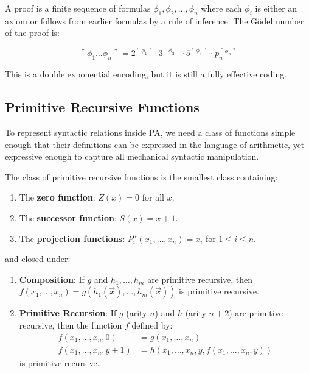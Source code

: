 A proof is a finite sequence of formulas $\phi_1, \phi_2, \dots, \phi_n$ where each $\phi_i$ is either an axiom or follows from earlier formulas by a rule of inference. The Gödel number of the proof is:

\[
\ulcorner \phi_1 \dots \phi_n \urcorner = 2^{\ulcorner \phi_1 \urcorner} \cdot 3^{\ulcorner \phi_2 \urcorner} \cdot 5^{\ulcorner \phi_3 \urcorner} \cdots p_n^{\ulcorner \phi_n \urcorner}
\]

This is a double exponential encoding, but it is still a fully effective coding.

\subsection{Primitive Recursive Functions}
\label{sec:godel:primrec}

To represent syntactic relations inside PA, we need a class of functions simple enough that their definitions can be expressed in the language of arithmetic, yet expressive enough to capture all mechanical syntactic manipulation.

\begin{definition}
The class of primitive recursive functions is the smallest class containing:
\begin{enumerate}
\item The \textbf{zero function}: $Z(x) = 0$ for all $x$.
\item The \textbf{successor function}: $S(x) = x+1$.
\item The \textbf{projection functions}: $P_i^n(x_1, \dots, x_n) = x_i$ for $1 \le i \le n$.
\end{enumerate}
and closed under:
\begin{enumerate}
\item[4.] \textbf{Composition}: If $g$ and $h_1, \dots, h_m$ are primitive recursive, then $f(x_1, \dots, x_n) = g(h_1(\vec{x}), \dots, h_m(\vec{x}))$ is primitive recursive.
\item[5.] \textbf{Primitive Recursion}: If $g$ (arity $n$) and $h$ (arity $n+2$) are primitive recursive, then the function $f$ defined by:
\[
\begin{aligned}
f(x_1, \dots, x_n, 0) &= g(x_1, \dots, x_n) \\
f(x_1, \dots, x_n, y+1) &= h(x_1, \dots, x_n, y, f(x_1, \dots, x_n, y))
\end{aligned}
\]
is primitive recursive.
\end{enumerate}
\end{definition}

